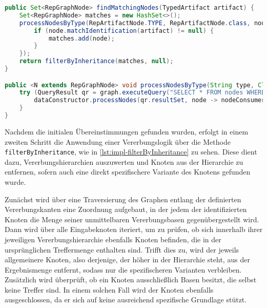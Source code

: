 \begin{lstlisting}[language=Java,caption={Methoden \texttt{findMatchingNodes} und \texttt{processNodesByType}},label=lst:impl-findMatchingNodes,basicstyle=\ttfamily\scriptsize]
public Set<RepGraphNode> findMatchingNodes(TypedArtifact artifact) {
    Set<RepGraphNode> matches = new HashSet<>();
    processNodesByType(RepArtifactNode.TYPE, RepArtifactNode.class, node -> {
        if (node.matchIdentification(artifact) != null) {
            matches.add(node);
        }
    });
    return filterByInheritance(matches, null);
}

public <N extends RepGraphNode> void processNodesByType(String type, Class<N> clazz, Consumer<N> nodeConsumer) {
    try (QueryResult qr = graph.executeQuery("SELECT * FROM nodes WHERE nodeType = ?", type)) {
        dataConstructor.processNodes(qr.resultSet, node -> nodeConsumer.accept(clazz.cast(node)));
    }
}
\end{lstlisting}

Nachdem die initialen Übereinstimmungen gefunden wurden, erfolgt in einem zweiten Schritt die Anwendung einer Vererbungslogik über die Methode \texttt{filterByInheritance}, wie in \autoref{lst:impl-filterByInheritance} zu sehen.
Diese dient dazu, Vererbungshierarchien auszuwerten und Knoten aus der Hierarchie zu entfernen, sofern auch eine direkt spezifischere Variante des Knotens gefunden wurde.

Zunächst wird über eine Traversierung des Graphen entlang der definierten Vererbungskanten eine Zuordnung aufgebaut, in der jedem der identifizierten Knoten die Menge seiner unmittelbaren Vererbungsbasen gegenübergestellt wird.
Dann wird über alle Eingabeknoten iteriert, um zu prüfen, ob sich innerhalb ihrer jeweiligen Vererbungshierarchie ebenfalls Knoten befinden, die in der ursprünglichen Treffermenge enthalten sind.
Trifft dies zu, wird der jeweils allgemeinere Knoten, also derjenige, der höher in der Hierarchie steht, aus der Ergebnismenge entfernt, sodass nur die spezifischeren Varianten verbleiben.
Zusätzlich wird überprüft, ob ein Knoten ausschließlich Basen besitzt, die selbst keine Treffer sind.
In einem solchen Fall wird der Knoten ebenfalls ausgeschlossen, da er sich auf keine ausreichend spezifische Grundlage stützt.

